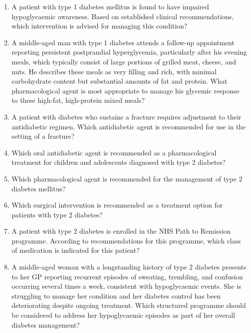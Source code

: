 \begin{enumerate}
\item A patient with type 1 diabetes mellitus is found to have impaired hypoglycaemic awareness. Based on established clinical recommendations, which intervention is advised for managing this condition?

\item A middle-aged man with type 1 diabetes attends a follow-up appointment reporting persistent postprandial hyperglycemia, particularly after his evening meals, which typically consist of large portions of grilled meat, cheese, and nuts. He describes these meals as very filling and rich, with minimal carbohydrate content but substantial amounts of fat and protein. What pharmacological agent is most appropriate to manage his glycemic response to these high-fat, high-protein mixed meals?

\item A patient with diabetes who sustains a fracture requires adjustment to their antidiabetic regimen. Which antidiabetic agent is recommended for use in the setting of a fracture?

\item Which oral antidiabetic agent is recommended as a pharmacological treatment for children and adolescents diagnosed with type 2 diabetes?

\item Which pharmacological agent is recommended for the management of type 2 diabetes mellitus?

\item Which surgical intervention is recommended as a treatment option for patients with type 2 diabetes?

\item A patient with type 2 diabetes is enrolled in the NHS Path to Remission programme. According to recommendations for this programme, which class of medication is indicated for this patient?

\item A middle-aged woman with a longstanding history of type 2 diabetes presents to her GP reporting recurrent episodes of sweating, trembling, and confusion occurring several times a week, consistent with hypoglycaemic events. She is struggling to manage her condition and her diabetes control has been deteriorating despite ongoing treatment. Which structured programme should be considered to address her hypoglycaemic episodes as part of her overall diabetes management?


\end{enumerate}
